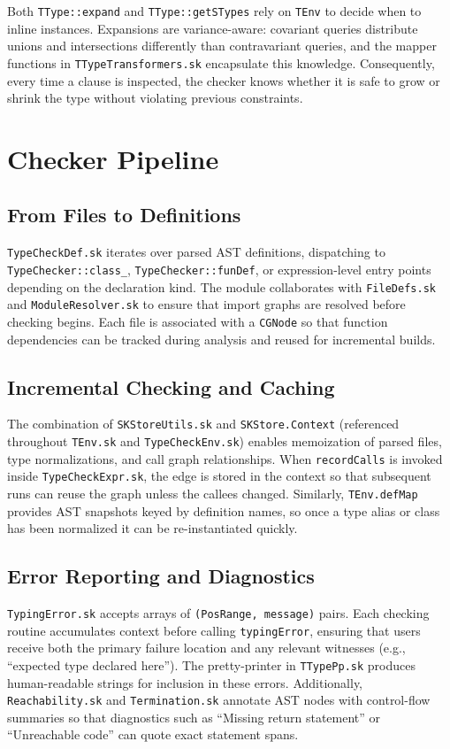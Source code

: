 \documentclass[11pt]{article}
\begin{document}
Both \texttt{TType::expand} and \texttt{TType::getSTypes} rely on \texttt{TEnv} to decide when to inline instances. Expansions are variance-aware: covariant queries distribute unions and intersections differently than contravariant queries, and the mapper functions in \texttt{TTypeTransformers.sk} encapsulate this knowledge. Consequently, every time a clause is inspected, the checker knows whether it is safe to grow or shrink the type without violating previous constraints.

\section{Checker Pipeline}
\subsection{From Files to Definitions}
\texttt{TypeCheckDef.sk} iterates over parsed AST definitions, dispatching to \texttt{TypeChecker::class\_}, \texttt{TypeChecker::funDef}, or expression-level entry points depending on the declaration kind. The module collaborates with \texttt{FileDefs.sk} and \texttt{ModuleResolver.sk} to ensure that import graphs are resolved before checking begins. Each file is associated with a \texttt{CGNode} so that function dependencies can be tracked during analysis and reused for incremental builds.

\subsection{Incremental Checking and Caching}
The combination of \texttt{SKStoreUtils.sk} and \texttt{SKStore.Context} (referenced throughout \texttt{TEnv.sk} and \texttt{TypeCheckEnv.sk}) enables memoization of parsed files, type normalizations, and call graph relationships. When \texttt{recordCalls} is invoked inside \texttt{TypeCheckExpr.sk}, the edge is stored in the context so that subsequent runs can reuse the graph unless the callees changed. Similarly, \texttt{TEnv.defMap} provides AST snapshots keyed by definition names, so once a type alias or class has been normalized it can be re-instantiated quickly.

\subsection{Error Reporting and Diagnostics}
\texttt{TypingError.sk} accepts arrays of \texttt{(PosRange, message)} pairs. Each checking routine accumulates context before calling \texttt{typingError}, ensuring that users receive both the primary failure location and any relevant witnesses (e.g., ``expected type declared here''). The pretty-printer in \texttt{TTypePp.sk} produces human-readable strings for inclusion in these errors. Additionally, \texttt{Reachability.sk} and \texttt{Termination.sk} annotate AST nodes with control-flow summaries so that diagnostics such as ``Missing return statement'' or ``Unreachable code'' can quote exact statement spans.
\end{document}

